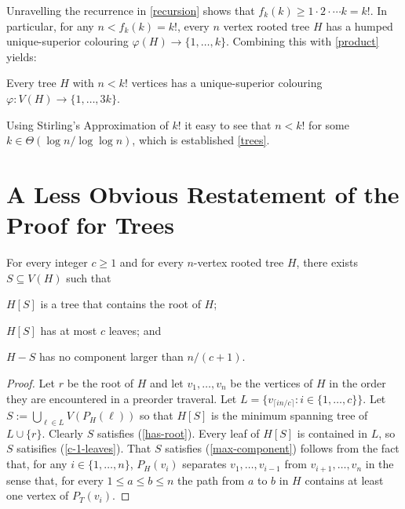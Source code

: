 \documentclass[kpfonts]{patmorin}
\begin{document}
Unravelling the recurrence in \cref{recursion} shows that $f_k(k)\ge 1\cdot2\cdot\cdots k=k!$.  In particular, for any $n < f_k(k)=k!$, every $n$ vertex rooted tree $H$ has a humped unique-superior colouring $\varphi(H)\to\{1,\ldots,k\}$. Combining this with \cref{product} yields:

\begin{thm}
    Every tree $H$ with $n<k!$ vertices has a unique-superior colouring $\varphi:V(H)\to\{1,\ldots,3k\}$.
\end{thm}

Using Stirling's Approximation of $k!$ it easy to see that $n < k!$ for some $k\in\Theta(\log n/\log\log n)$, which is established \cref{trees}.

\section{A Less Obvious Restatement of the Proof for Trees}

\begin{lem}\label{tree-separator}
    For every integer $c\ge 1$ and for every $n$-vertex rooted tree $H$, there exists $S\subseteq V(H)$ such that
    \begin{inparaenum}[(i)]
        \item $H[S]$ is a tree that contains the root of $H$; \label{has-root}
        \item $H[S]$ has at most $c$ leaves; and \label{c-1-leaves}
        \item $H-S$ has no component larger than $n/(c+1)$. \label{max-component}
    \end{inparaenum}
\end{lem}

\begin{proof}
    Let $r$ be the root of $H$ and let $v_1,\ldots,v_n$ be the vertices of $H$ in the order they are encountered in a preorder traveral.  Let $L=\{v_{\lceil in/c\rceil}: i\in\{1,\ldots,c\}\}$.  Let $S:=\bigcup_{\ell\in L} V(P_H(\ell))$ so that $H[S]$ is the minimum spanning tree of $L\cup\{r\}$.  Clearly $S$ satisfies (\ref{has-root}).  Every leaf of $H[S]$ is contained in $L$, so $S$ satisifies (\ref{c-1-leaves}).  That $S$ satisfies (\ref{max-component}) follows from the fact that, for any $i\in\{1,\ldots,n\}$, $P_H(v_i)$ separates $v_1,\ldots,v_{i-1}$ from $v_{i+1},\ldots,v_n$ in the sense that, for every $1\le a\le b\le n$ the path from $a$ to $b$ in $H$ contains at least one vertex of $P_T(v_i)$.
\end{proof}
\end{document}
